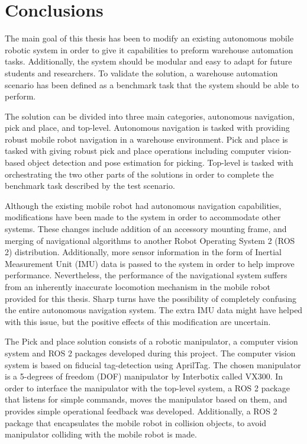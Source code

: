 \chapter{Conclusions}
The main goal of this thesis has been to modify an existing autonomous mobile robotic system in order to give it capabilities to preform warehouse automation tasks. Additionally, the system should be modular and easy to adapt for future students and researchers. To validate the solution, a warehouse automation scenario has been defined as a benchmark task that the system should be able to perform. 

The solution can be divided into three main categories, autonomous navigation, pick and place, and top-level. Autonomous navigation is tasked with providing robust mobile robot navigation in a warehouse environment. Pick and place is tasked with giving robust pick and place operations including computer vision-based object detection and pose estimation for picking. Top-level is tasked with orchestrating the two other parts of the solutions in order to complete the benchmark task described by the test scenario.

Although the existing mobile robot had autonomous navigation capabilities, modifications have been made to the system in order to accommodate other systems. These changes include addition of an accessory mounting frame, and merging of navigational algorithms to another Robot Operating System 2 (ROS 2) distribution. Additionally, more sensor information in the form of Inertial Measurement Unit (IMU) data is passed to the system in order to help improve performance. Nevertheless, the performance of the navigational system suffers from an inherently inaccurate locomotion mechanism in the mobile robot provided for this thesis. Sharp turns have the possibility of completely confusing the entire autonomous navigation system. The extra IMU data might have helped with this issue, but the positive effects of this modification are uncertain.

The Pick and place solution consists of a robotic manipulator, a computer vision system and ROS 2 packages developed during this project. The computer vision system is based on fiducial tag-detection using AprilTag. The chosen manipulator is a 5-degrees of freedom (DOF) manipulator by Interbotix called VX300. In order to interface the manipulator with the top-level system, a ROS 2 package that listens for simple commands, moves the manipulator based on them, and provides simple operational feedback was developed. Additionally, a ROS 2 package that encapsulates the mobile robot in collision objects, to avoid manipulator colliding with the mobile robot is made.

